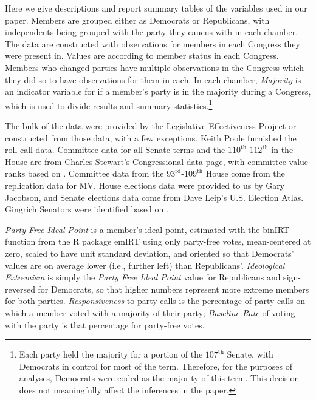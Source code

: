 \documentclass[12pt]{article}
\begin{document}
Here we give descriptions and report summary tables of the variables used in our paper. Members are grouped either as Democrats or Republicans, with independents being grouped with the party they caucus with in each chamber. The data are constructed with observations for members in each Congress they were present in. Values are according to member status in each Congress. Members who changed parties have multiple observations in the Congress which they did so to have observations for them in each. In each chamber, \textit{Majority} is an indicator variable for if a member's party is in the majority during a Congress, which is used to divide results and summary statistics.\footnote{\doublespacing\normalsize Each party held the majority for a portion of the $107^{\text{th}}$ Senate, with Democrats in control for most of the term.  Therefore, for the purposes of analyses, Democrats were coded as the majority of this term.  This decision does not meaningfully affect the inferences in the paper.}

The bulk of the data were provided by the Legislative Effectiveness Project \citep{Volden:2014} or constructed from those data, with a few exceptions. Keith Poole furnished the roll call data.  Committee data for all Senate terms and the $110^{\text{th}}$-$112^{\text{th}}$ in the House are from Charles Stewart's Congressional data page, with committee value ranks based on \cite{Groseclose:1998}.
Committee data from the $93^{\text{rd}}$-$109^{\text{th}}$ House come from the replication data for MV.  House elections data were provided to us by Gary Jacobson, and Senate elections data come from Dave Leip's U.S. Election Atlas.
Gingrich Senators were identified based on \cite{Theriault:2013}.

\textit{Party-Free Ideal Point} is a member's ideal point, estimated with the \textsf{binIRT} function from the \textsf{R} package \textsf{emIRT} using only party-free votes, mean-centered at zero, scaled to have unit standard deviation, and oriented so that Democrats' values are on average lower (i.e., further left) than Republicans'. \textit{Ideological Extremism} is simply the \textit{Party Free Ideal Point} value for Republicans and sign-reversed for Democrats, so that higher numbers represent more extreme members for both parties. \textit{Responsiveness} to party calls is the percentage of party calls on which a member voted with a majority of their party; \textit{Baseline Rate}  of voting with the party is that percentage for party-free votes.
\end{document}
